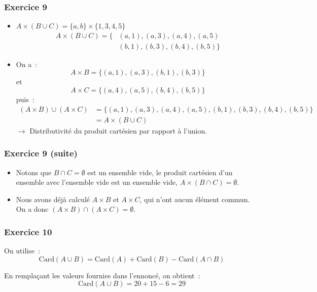 \documentclass[10pt,notheorems]{beamer}
\theoremstyle{plain}
\theoremstyle{definition} %
\begin{document}
\begin{frame}
  \frametitle{Exercice 9}
  \fontsize{8}{10}\selectfont

  \begin{itemize}

  \item $A\times (B\cup C) = \{a,b\}\times\{1,3,4,5\}$
    \[
      \begin{split}
        A\times (B\cup C) = \bigl\{ &(a, 1), (a,3), (a, 4), (a, 5)\\
        &(b, 1), (b,3), (b, 4), (b, 5)\bigr\}
      \end{split}
    \]

  \item On a~:
    \[
      A\times B = \bigl\{ (a, 1), (a,3), (b, 1), (b,3)\bigr\}
    \]
    et
    \[
      A\times C = \bigl\{ (a, 4), (a,5), (b, 4), (b,5)\bigr\}
    \]
    puis~:
    \[
      \begin{split}
        (A\times B)\cup(A\times C) &= \bigl\{(a, 1), (a,3), (a, 4), (a, 5), (b, 1), (b,3), (b, 4), (b, 5)\bigr\}\\
        &= A\times (B\cup C)
      \end{split}
    \]
    $\rightarrow$ Distributivité du produit cartésien par rapport à l'union.
  \end{itemize}

\end{frame}


\begin{frame}
  \frametitle{Exercice 9 (suite)}
  \fontsize{8}{10}\selectfont

  \begin{itemize}

  \item Notons que $B\cap C = \emptyset$ est un ensemble vide, le produit cartésien d'un ensemble avec l'ensemble vide est un ensemble vide, $A\times (B\cap C) = \emptyset$.\newline

  \item Nous avons déjà calculé $A\times B$ et $A\times C$, qui n'ont aucun élément commun. On a donc
    $(A\times B)\cap(A\times C) = \emptyset$.
  \end{itemize}

\end{frame}


\begin{frame}
  \frametitle{Exercice 10}
  \fontsize{8}{10}\selectfont


  On utilise~:
    \[
      \textrm{Card}(A \cup B) = \textrm{Card}(A) + \textrm{Card}(B) - \textrm{Card}(A\cap B)
    \]

    En remplaçant les valeurs fournies dans l'ennoncé, on obtient~:
    \[
      \textrm{Card}(A \cup B) = 20+15-6 = 29
    \]

  \end{frame}
\end{document}
